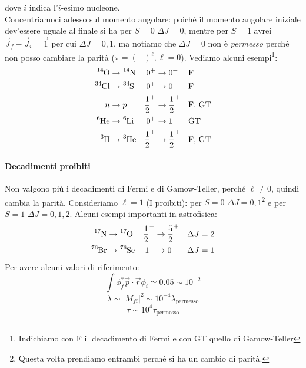 dove $i$ indica l'$i$-esimo nucleone. \\
Concentriamoci adesso sul momento angolare: poiché il momento angolare iniziale dev'essere uguale al finale si ha per $S=0$ $\Delta J = 0$, mentre per $S=1$ avrei $\vec{J}_f - \vec{J}_i = \vec{1} $ per cui $\Delta J = 0,1$, ma notiamo che $\Delta J=0$ non è \textit{permesso} perché non posso cambiare la parità ($\pi = (-)^\ell, \ell=0$). Vediamo alcuni esempi\footnote{Indichiamo con F il decadimento di Fermi e con GT quello di Gamow-Teller}:
\begin{displaymath}
\begin{aligned}
\ce{^{14}O} &\to \ce{^{14}N} & 0^+&\to0^+ & &\text{F} \\
\ce{^{34}Cl} &\to \ce{^{34}S} & 0^+&\to0^+ & &\text{F} \\
n &\to p & \frac{1}{2}^+&\to\frac{1}{2}^+ & &\text{F, GT} \\
\ce{^{6}He} &\to \ce{^{6}Li} & 0^+&\to1^+ & &\text{GT} \\
\ce{^{3}H} &\to \ce{^{3}He} & \frac{1}{2}^+&\to\frac{1}{2}^+ & &\text{F, GT} 
\end{aligned}
\end{displaymath}

\paragraph{Decadimenti proibiti} Non valgono più i decadimenti di Fermi e di Gamow-Teller, perché $\ell\not =0 $, quindi cambia la parità. Consideriamo $\ell=1$ (I proibiti): per $S=0$ $\Delta J = 0,1$\footnote{Questa volta prendiamo entrambi perché si ha un cambio di parità.} e per $S=1$ $\Delta J = 0,1,2$. Alcuni esempi importanti in astrofisica:
\begin{displaymath}
\begin{aligned}
\ce{^{17}N}&\to \ce{^{17}O} & \frac{1}{2}^- &\to \frac{5}{2}^+ & \Delta J = 2 \\
\ce{^{76}Br}&\to \ce{^{76}Se} & 1^- &\to 0^+ & \Delta J = 1
\end{aligned}
\end{displaymath}
Per avere alcuni valori di riferimento:
$$\int \phi_f^* \vec{p}\cdot \vec{r} \phi_i \simeq 0.05 \sim 10^{-2}  $$
$$\lambda \sim |M_{fi}|^2\sim 10^{-4} \lambda_\text{permesso}$$
$$\tau \sim 10^4 \tau_\text{permesso}$$
